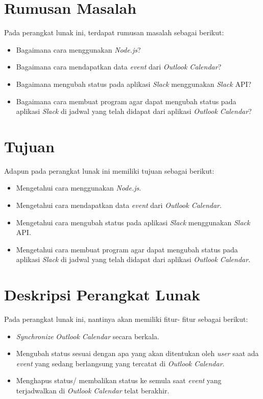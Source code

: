\documentclass[a4paper,twoside]{article}
\begin{document}
\section{Rumusan Masalah}
Pada perangkat lunak ini, terdapat rumusan masalah sebagai berikut:
\begin{itemize}
	\item Bagaimana cara menggunakan \textit{Node.js}?
	\item Bagaimana cara mendapatkan data \textit{event} dari \textit{Outlook Calendar}?
	\item Bagaimana mengubah status pada aplikasi \textit{Slack} menggunakan \textit{Slack} API?  
	\item Bagaimana cara membuat program agar dapat mengubah status pada aplikasi \textit{Slack} di jadwal yang telah didapat dari aplikasi \textit{Outlook Calendar}? 
	
\end{itemize}

\section{Tujuan}
Adapun pada perangkat lunak ini memiliki tujuan sebagai berikut:
\begin{itemize}
	\item Mengetahui cara menggunakan \textit{Node.js}. 
	\item Mengetahui cara mendapatkan data \textit{event} dari \textit{Outlook Calendar}.   
	\item Mengetahui cara mengubah status pada aplikasi \textit{Slack} menggunakan \textit{Slack} API. 
	\item Mengetahui cara membuat program agar dapat mengubah status pada aplikasi \textit{Slack} di jadwal yang telah didapat dari aplikasi \textit{Outlook Calendar}.  
	
\end{itemize}

\section{Deskripsi Perangkat Lunak}
Pada perangkat lunak ini, nantinya akan memiliki fitur- fitur sebagai berikut:
\begin{itemize}
	\item \textit{Synchronize} \textit{Outlook Calendar} secara berkala. 
	\item Mengubah status sesuai dengan apa yang akan ditentukan oleh \textit{user} saat ada \textit{event} yang sedang berlangsung yang tercatat di \textit{Outlook Calendar}. 
	\item Menghapus status/ membalikan status ke semula saat \textit{event} yang terjadwalkan di \textit{Outlook Calendar} telat berakhir. 
	
\end{itemize}
\end{document}
